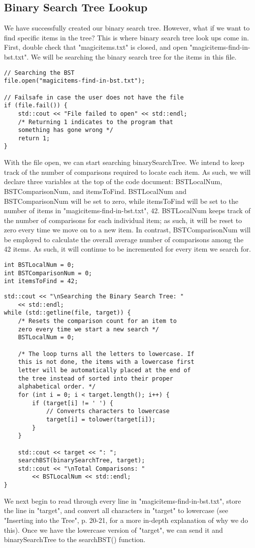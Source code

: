 \documentclass{article}
\begin{document}
\subsection{Binary Search Tree Lookup}
We have successfully created our binary search tree. However, what if we want to find specific items in the tree? This is where binary search tree look ups come in. \\
First, double check that "magicitems.txt" is closed, and open "magicitems-find-in-bst.txt". We will be searching the binary search tree for the items in this file. 
\begin{lstlisting}
// Searching the BST
file.open("magicitems-find-in-bst.txt");

// Failsafe in case the user does not have the file
if (file.fail()) {
    std::cout << "File failed to open" << std::endl;
    /* Returning 1 indicates to the program that 
    something has gone wrong */
    return 1;
}
\end{lstlisting}
With the file open, we can start searching binarySearchTree. We intend to keep track of the number of comparisons required to locate each item. As such, we will declare three variables at the top of the code document: BSTLocalNum, BSTComparisonNum, and itemsToFind. BSTLocalNum and BSTComparisonNum will be set to zero, while itemsToFind will be set to the number of items in "magicitems-find-in-bst.txt", 42. BSTLocalNum keeps track of the number of comparisons for each individual item; as such, it will be reset to zero every time we move on to a new item. In contrast, BSTComparisonNum will be employed to calculate the overall average number of comparisons among the 42 items. As such, it will continue to be incremented for every item we search for. 
\begin{lstlisting}
int BSTLocalNum = 0;
int BSTComparisonNum = 0;
int itemsToFind = 42;
\end{lstlisting}
\begin{lstlisting}
std::cout << "\nSearching the Binary Search Tree: " 
    << std::endl;
while (std::getline(file, target)) {
    /* Resets the comparison count for an item to 
    zero every time we start a new search */
    BSTLocalNum = 0;

    /* The loop turns all the letters to lowercase. If 
    this is not done, the items with a lowercase first 
    letter will be automatically placed at the end of 
    the tree instead of sorted into their proper 
    alphabetical order. */
    for (int i = 0; i < target.length(); i++) {
        if (target[i] != ' ') {
            // Converts characters to lowercase
            target[i] = tolower(target[i]);
        }
    }

    std::cout << target << ": ";
    searchBST(binarySearchTree, target);
    std::cout << "\nTotal Comparisons: " 
        << BSTLocalNum << std::endl;
}
\end{lstlisting}
We next begin to read through every line in "magicitems-find-in-bst.txt", store the line in "target", and convert all characters in "target" to lowercase (see "Inserting into the Tree", p. 20-21, for a more in-depth explanation of why we do this). Once we have the lowercase version of "target", we can send it and binarySearchTree to the searchBST() function. 
\end{document}
